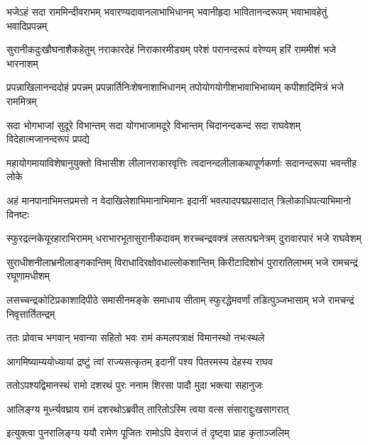 \begin{minipage}{\linewidth}

\fourlineindentedshloka
{भजेऽहं सदा राममिन्दीवराभम्}
{भवारण्यदावानलाभाभिधानम्}
{भवानीहृदा भावितानन्दरूपम्}
{भवाभावहेतुं भवादिप्रपन्नम्} %
\end{minipage}

\fourlineindentedshloka
{सुरानीकदुःखौघनाशैकहेतुम्}
{नराकारदेहं निराकारमीड्यम्}
{परेशं परानन्दरूपं वरेण्यम्}
{हरिं राममीशं भजे भारनाशम्} %

\fourlineindentedshloka
{प्रपन्नाखिलानन्ददोहं प्रपन्नम्}
{प्रपन्नार्तिनिःशेषनाशाभिधानम्}
{तपोयोगयोगीशभावाभिभाव्यम्}
{कपीशादिमित्रं भजे राममित्रम्} %

\fourlineindentedshloka
{सदा भोगभाजां सुदूरे विभान्तम्}
{सदा योगभाजामदूरे विभान्तम्}
{चिदानन्दकन्दं सदा राघवेशम्}
{विदेहात्मजानन्दरूपं प्रपद्ये} %

\fourlineindentedshloka
{महायोगमायाविशेषानुयुक्तो}
{विभासीश लीलानराकारवृत्तिः}
{त्वदानन्दलीलाकथापूर्णकर्णाः}
{सदानन्दरूपा भवन्तीह लोके} %

\fourlineindentedshloka
{अहं मानपानाभिमत्तप्रमत्तो}
{न वेदाखिलेशाभिमानाभिमानः}
{इदानीं भवत्पादपद्मप्रसादात्}
{त्रिलोकाधिपत्याभिमानो विनष्टः} %

\fourlineindentedshloka
{स्फुरद्रत्नकेयूरहाराभिरामम्}
{धराभारभूतासुरानीकदावम्}
{शरच्चन्द्रवक्त्रं लसत्पद्मनेत्रम्}
{दुरावारपारं भजे राघवेशम्} %

\fourlineindentedshloka
{सुराधीशनीलाभ्रनीलाङ्गकान्तिम्}
{विराधादिरक्षोवधाल्लोकशान्तिम्}
{किरीटादिशोभं पुरारातिलाभम्}
{भजे रामचन्द्रं रघूणामधीशम्} %

\fourlineindentedshloka
{लसच्चन्द्रकोटिप्रकाशादिपीठे}
{समासीनमङ्के समाधाय सीताम्}
{स्फुरद्धेमवर्णां तडित्पुञ्जभासाम्}
{भजे रामचन्द्रं निवृत्तार्तितन्द्रम्} %

\twolineshloka
{ततः प्रोवाच भगवान् भवान्या सहितो भवः}
{रामं कमलपत्राक्षं विमानस्थो नभःस्थले} %

\twolineshloka
{आगमिष्याम्ययोध्यायां द्रष्टुं त्वां राज्यसत्कृतम्}
{इदानीं पश्य पितरमस्य देहस्य राघव} %

\twolineshloka
{ततोऽपश्यद्विमानस्थं रामो दशरथं पुरः}
{ननाम शिरसा पादौ मुदा भक्त्या सहानुजः} %

\twolineshloka
{आलिङ्ग्य मूर्ध्न्यवघ्राय रामं दशरथोऽब्रवीत्}
{तारितोऽस्मि त्वया वत्स संसाराद्दुःखसागरात्} %

\twolineshloka
{इत्युक्त्वा पुनरालिङ्ग्य ययौ रामेण पूजितः}
{रामोऽपि देवराजं तं दृष्ट्वा प्राह कृताञ्जलिम्} %

